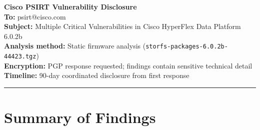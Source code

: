 \documentclass[11pt,a4paper]{article}
\begin{document}

\thispagestyle{plain}
\begin{center}
{\large\bfseries Cisco PSIRT Vulnerability Disclosure}\\[0.4em]
{\normalsize
\textbf{To:} psirt@cisco.com\\[0.2em]
\textbf{Subject:} Multiple Critical Vulnerabilities in Cisco HyperFlex Data Platform 6.0.2b\\[0.2em]
\textbf{Analysis method:} Static firmware analysis
(\texttt{storfs-packages-6.0.2b-44423.tgz})\\[0.2em]
\textbf{Encryption:} PGP response requested; findings contain sensitive technical detail\\[0.2em]
\textbf{Timeline:} 90-day coordinated disclosure from first response
}
\end{center}

\vspace{1em}
\noindent\rule{\linewidth}{0.6pt}
\vspace{0.5em}

\section*{Summary of Findings}
\end{document}
